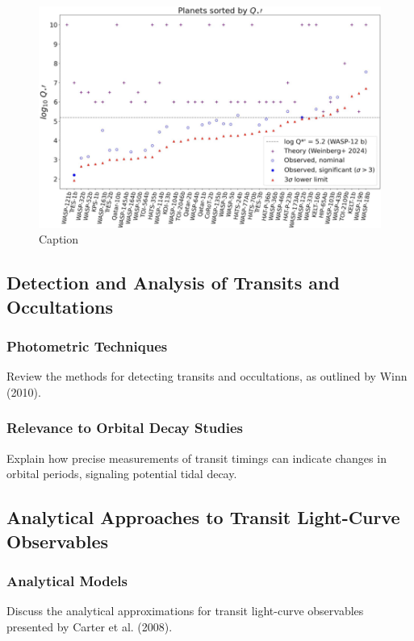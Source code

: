 \documentclass[oneside,12pt]{amsart}
\numberwithin{page}{section}
\begin{document}
\begin{figure}[htbp]
    \centering
    \includegraphics[width=\linewidth]{figs/adams_fig11.png}
    \caption{Caption}
    \label{fig:adams-fig11}
\end{figure}




\subsection{Detection and Analysis of Transits and Occultations}

\subsubsection{Photometric Techniques}
Review the methods for detecting transits and occultations, as outlined by Winn (2010).

\subsubsection{Relevance to Orbital Decay Studies}
Explain how precise measurements of transit timings can indicate changes in orbital periods, signaling potential tidal decay.





\subsection{Analytical Approaches to Transit Light-Curve Observables}

\subsubsection{Analytical Models}
Discuss the analytical approximations for transit light-curve observables presented by Carter et al. (2008).
\end{document}
